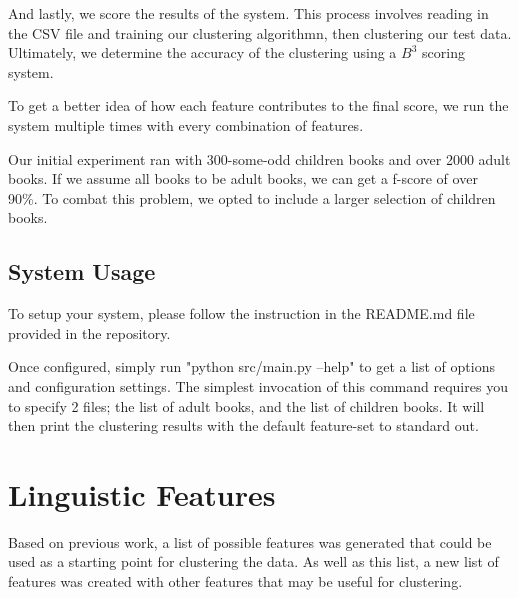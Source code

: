 \documentclass[]{article}
\begin{document}
And lastly, we score the results of the system.
This process involves reading in the CSV file and training our clustering algorithmn, then clustering our test data.
Ultimately, we determine the accuracy of the clustering using a $B^3$ scoring system.

To get a better idea of how each feature contributes to the final score, we run the system multiple times with every combination of features.

Our initial experiment ran with 300-some-odd children books and over 2000 adult books.
If we assume all books to be adult books, we can get a f-score of over 90\%.
To combat this problem, we opted to include a larger selection of children books.

\subsection{System Usage}

To setup your system, please follow the instruction in the README.md file provided in the repository.

Once configured, simply run "python src/main.py --help" to get a list of options and configuration settings.
The simplest invocation of this command requires you to specify 2 files; the list of adult books, and the list of children books.
It will then print the clustering results with the default feature-set to standard out.

\section{Linguistic Features}

Based on previous work, a list of possible features was generated that could be used as a starting point for clustering the data.
As well as this list, a new list of features was created with other features that may be useful for clustering.
\end{document}
